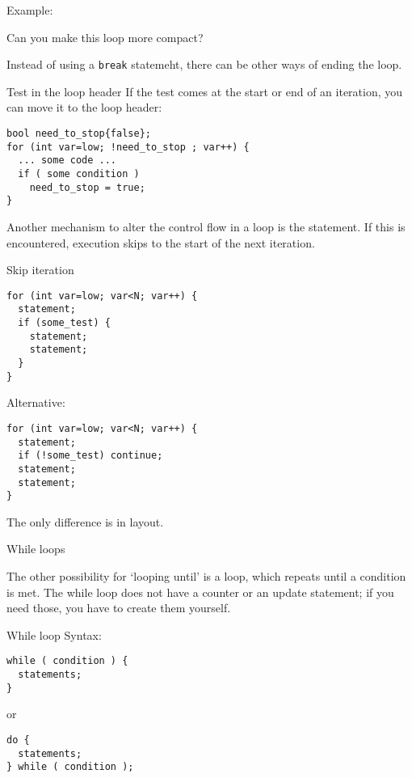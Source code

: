 Example:

\begin{exercise}
  Can you make this loop more compact?
\end{exercise}

Instead of using a \lstinline{break} statemeht,
there can be other ways of ending the loop.

\begin{block}{Test in the loop header}
  \label{sl:looptest}
  If the test comes at the start or end of an iteration, you can move it
  to the loop header:
\begin{lstlisting}
bool need_to_stop{false};
for (int var=low; !need_to_stop ; var++) {
  ... some code ...
  if ( some condition )
    need_to_stop = true;
}
\end{lstlisting}
\end{block}

Another mechanism to alter the control flow in a loop is the
 statement. If this is encountered, execution
skips to the start of the next iteration.

\begin{block}{Skip iteration}
  \label{sl:for-cont}
\begin{lstlisting}
for (int var=low; var<N; var++) {
  statement;
  if (some_test) {
    statement;
    statement;
  }
}
\end{lstlisting}
Alternative:
\begin{lstlisting}
for (int var=low; var<N; var++) {
  statement;
  if (!some_test) continue;
  statement;
  statement;
}
\end{lstlisting}
The only difference is in layout.
\end{block}

 {While loops}
\label{sec:while-loop}

The other possibility for `looping until' is a
 loop, which repeats until a condition is met.
The while loop does not have a counter or an update statement; if you
need those, you have to create them yourself.

\begin{block}{While loop}
  \label{sl:while}
  Syntax:
\begin{lstlisting}
while ( condition ) {
  statements;
}
\end{lstlisting}
or
\begin{lstlisting}
do {
  statements;
} while ( condition );
\end{lstlisting}
\end{block}

